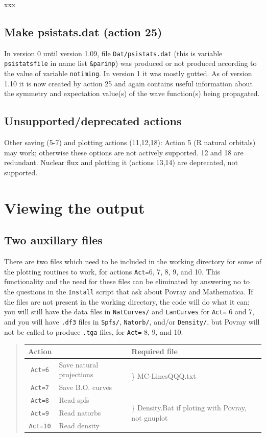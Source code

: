 \documentclass[10pt,leqno, oneside]{book}
\begin{document}
xxx


\section{Make psistats.dat (action 25)}

In version 0 until version 1.09, file \verb#Dat/psistats.dat# (this is variable \verb#psistatsfile# in name list \verb#&parinp#) was produced or not produced
according to the value of variable \verb#notiming#.  In version 1 it was mostly gutted.  As of version 1.10 it is now created by action 25 and again
contains useful information about the symmetry and expectation value(s) of the wave function(s) being propagated.  

\section{Unsupported/deprecated actions}

Other saving (5-7) and plotting actions (11,12,18):
Action 5 (R natural orbitals) may work; otherwise these options are not actively supported.  12 and 18 are redundant.
Nuclear flux and plotting it (actions 13,14) are deprecated, not supported.


\chapter{Viewing the output}

\section{Two auxillary files}

There are two files which need to be included in the working directory for some of the plotting routines to work, for actions \verb#Act=#6, 7, 8, 9, and 10.  This functionality and the need for these files can be eliminated by answering no to the questions in the \verb#Install# script that ask about Povray and Mathematica.  If the files are not present in the working directory, the code will do what it can; you will still have the data files in \verb#NatCurves/# and \verb#LanCurves# for \verb#Act=# 6 and 7, and you will have \verb#.df3# files in \verb#Spfs/#, \verb#Natorb/#, and/or \verb#Density/#, but Povray will not be called to produce \verb#.tga# files, for \verb#Act=# 8, 9, and 10.
\begin{quote}
\begin{tabular}{cll}
Action & & Required file \\
\hline
\verb#Act=6# & Save natural projections & \multirow{2}{*}{{\Large\}} MC-LinesQQQ.txt} \\
\verb#Act=7# & Save B.O. curves & \\
\verb#Act=8# & Read spfs & \multirow{3}{*}{{\Huge\}} Density.Bat if  ploting with Povray, not gnuplot }\\
\verb#Act=9# & Read natorbs &\\
\verb#Act=10# & Read density &\\
\end{tabular}
\end{quote}
\end{document}
